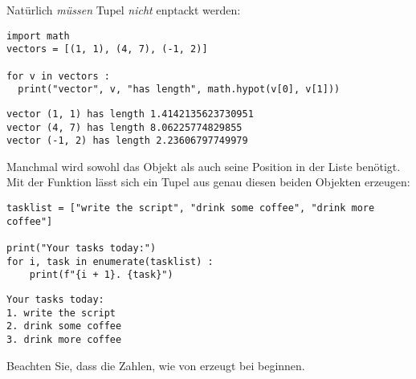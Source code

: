 Natürlich \emph{müssen} Tupel \emph{nicht} enptackt werden:
\begin{codebox}
\begin{verbatim}
import math
vectors = [(1, 1), (4, 7), (-1, 2)]

for v in vectors :
  print("vector", v, "has length", math.hypot(v[0], v[1]))
\end{verbatim}
\end{codebox}

\begin{cmdbox}
\begin{verbatim}
vector (1, 1) has length 1.4142135623730951
vector (4, 7) has length 8.06225774829855
vector (-1, 2) has length 2.23606797749979
\end{verbatim}
\end{cmdbox}


\begin{hintbox}
Manchmal wird sowohl das Objekt als auch seine Position in der Liste benötigt. Mit der Funktion  lässt sich ein Tupel aus genau diesen beiden Objekten erzeugen:

\begin{codebox}
\begin{verbatim}
tasklist = ["write the script", "drink some coffee", "drink more coffee"]

print("Your tasks today:")
for i, task in enumerate(tasklist) :
    print(f"{i + 1}. {task}")
\end{verbatim}
\end{codebox}

\begin{cmdbox}
\begin{verbatim}
Your tasks today:
1. write the script
2. drink some coffee
3. drink more coffee
\end{verbatim}
\end{cmdbox}

Beachten Sie, dass die Zahlen, wie von  erzeugt bei  beginnen.
\end{hintbox}

